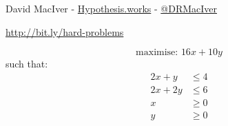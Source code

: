 \documentclass{beamer}
\begin{document}
    \begin{frame}
        \begin{center}
            David MacIver - \url{Hypothesis.works} -
            \href{https://twitter.com/DRMacIver}{@DRMacIver} 


            \vspace{1cm}
            \url{http://bit.ly/hard-problems}
        \end{center}
    \end{frame}

    \begin{frame}
        \[
            \text{maximise: }16 x + 10 y
        \]
        such that:
        \begin{align*}
            2 x + y   &\leq 4 \\
            2 x + 2 y &\leq 6 \\
            x         &\geq 0 \\
            y         &\geq 0 \\
        \end{align*}
    \end{frame}
\end{document}
